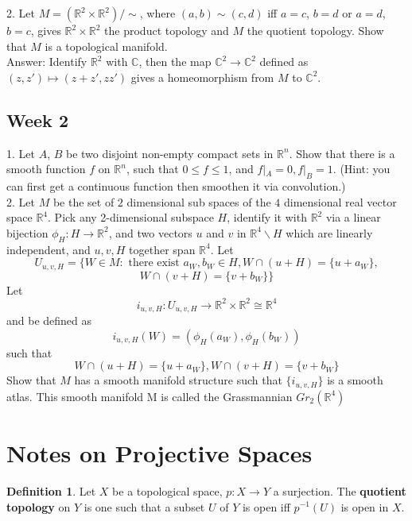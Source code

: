 \documentclass{article}
\theoremstyle{definition}
\newtheorem{dfn}[thm]{Definition}
\begin{document}
2. Let $M=(\mathbb{R}^2\times\mathbb{R}^2)/\sim$, where $(a, b)\sim (c, d)$ iff $a=c$, $b=d$ or $a=d$, $b=c$, gives $\mathbb{R}^2\times\mathbb{R}^2$ the product topology and $M$ the quotient topology. Show that $M$ is a topological manifold.\\

Answer: Identify $\mathbb{R}^2$ with $\mathbb{C}$, then the map $\mathbb{C}^2\rightarrow \mathbb{C}^2$ defined as $(z, z')\mapsto (z+z', zz')$ gives a homeomorphism from $M$ to $\mathbb{C}^2$.

\subsection{Week 2}

1. Let $A$, $B$ be two disjoint non-empty compact sets in $\mathbb{R}^n$. Show that there is a smooth function $f$ on $\mathbb{R}^n$, such that $0\leq f\leq 1$, and $f|_A=0, f|_B=1$. (Hint: you can first get a continuous function then smoothen it via convolution.)\\

2. Let $M$ be the set of $2$ dimensional sub spaces of the $4$ dimensional real vector space $\mathbb{R}^4$. Pick any 2-dimensional subspace $H$, identify it with $\mathbb{R}^2$ via a linear bijection $\phi_H: H\rightarrow \mathbb{R}^2$, and two vectors $u$ and $v$ in $\mathbb{R}^4\backslash H$ which are linearly independent, and $u, v, H$ together span $\mathbb{R}^4$. Let 
\[U_{u, v, H}=\{W\in M: \text{ there exist }a_W, b_W\in H, W\cap (u+H)=\{u+a_W\},\]
\[W\cap (v+H)=\{v+b_W\}\}\]
Let 
\[i_{u, v, H}: U_{u, v, H}\rightarrow \mathbb{R}^2\times \mathbb{R}^2\cong\mathbb{R}^4\]
and be defined as 
\[i_{u, v, H}(W)=(\phi_H(a_W), \phi_H(b_W))\]
such that
\[W\cap (u+H)=\{u+a_W\}, W\cap (v+H)=\{v+b_W\}\]
Show that $M$ has a smooth manifold structure such that $\{i_{u, v, H}\}$ is a smooth atlas. This smooth manifold M is called the Grassmannian $Gr_2(\mathbb{R}^4)$

\newpage

\section{Notes on Projective Spaces}

\begin{dfn}
    Let $X$ be a topological space, $p: X\rightarrow Y$ a surjection. The {\bf quotient topology} on $Y$ is one such that a subset $U$ of $Y$ is open iff $p^{-1}(U)$ is open in $X$.
\end{dfn}
\end{document}
